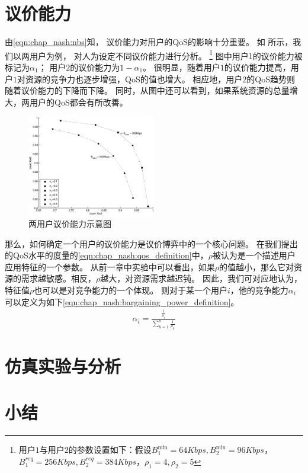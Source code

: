 \section{议价能力}
由\eqref{eqn:chap_nash:nbs}知，
议价能力对用户的QoS的影响十分重要。
如 所示，我们以两用户为例，
对人为设定不同议价能力进行分析。
\footnote{用户$1$与用户$2$的参数设置如下：假设$B_1^{\min}=64Kbps, B_2^{\min}=96Kbps$，$B_1^{req}=256Kbps, B_2^{req}=384Kbps$，$\rho_1=4, \rho_2=5$}
图中用户$1$的议价能力被标记为$\alpha_1$；
用户$2$的议价能力为$1-\alpha_1$。
很明显，随着用户$1$的议价能力提高，用户$1$对资源的竞争力也逐步增强，QoS的值也增大。
相应地，用户$2$的QoS趋势则随着议价能力的下降而下降。
同时，从图中还可以看到，如果系统资源的总量增大，两用户的QoS都会有所改善。
\begin{figure}[!tb] 
    \centering 
    \includegraphics[width = 0.5\textwidth]{chap_nash_two_users_nbs_qos.eps} 
    \caption{两用户议价能力示意图}
    \label{fig:chap_nash:two_users_nbs_qos} 
\end{figure}
那么，如何确定一个用户的议价能力是议价博弈中的一个核心问题。
在我们提出的QoS水平的度量的\eqref{eqn:chap_nash:qos_definition}中，$\rho$被认为是一个描述用户应用特征的一个参数。
从前一章中实验中可以看出，如果$\rho$的值越小，那么它对资源的需求越敏感。相反，$\rho$越大，对资源需求越迟钝。
因此，我们可对应地认为，特征值$\rho$也可以是对竞争能力的一个体现。
则对于某一个用户$i$，他的竞争能力$\alpha_i$可以定义为如下\eqref{eqn:chap_nash:bargaining_power_definition}。
\begin{align}
    \alpha_i = \frac{\frac{1}{\rho_i}}{\sum_{k=1}^n \frac{1}{\rho_k} }
    \label{eqn:chap_nash:bargaining_power_definition}
\end{align}
\section{仿真实验与分析}

\section{小结}






